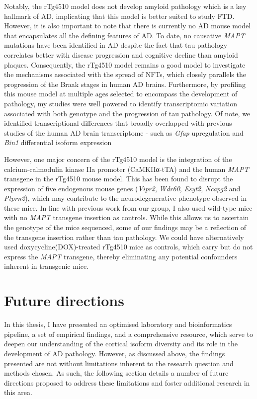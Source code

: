 Notably, the rTg4510 model does not develop amyloid pathology which is a key hallmark of AD, implicating that this model is better suited to study FTD. However, it is also important to note that there is currently no AD mouse model that encapsulates all the defining features of AD. To date, no causative \textit{MAPT} mutations have been identified in AD despite the fact that tau pathology correlates better with disease progression and cognitive decline than amyloid plaques\cite{Serrano-Pozo2016,Giannakopoulos2003,PV1992}. Consequently, the rTg4510 model remains a good model to investigate the mechanisms associated with the spread of NFTs, which closely parallels the progression of the Braak stages in human AD brains. Furthermore, by profiling this mouse model at multiple ages selected to encompass the development of pathology, my studies were well powered to identify transcriptomic variation associated with both genotype and the progression of tau pathology. Of note, we identified transcriptional differences that broadly overlapped with previous studies of the human AD brain transcriptome - such as \textit{Gfap} upregulation and \textit{Bin1} differential isoform expression

However, one major concern of the rTg4510 model is the integration of the calcium-calmodulin kinase IIa promoter (CaMKIIα-tTA) and the human \textit{MAPT} transgene in the rTg4510 mouse model. This has been found to disrupt the expression of five endogenous mouse genes (\textit{Vipr2}, \textit{Wdr60}, \textit{Esyt2}, \textit{Ncapg2} and \textit{Ptprn2}), which may contribute to the neurodegenerative phenotype observed in these mice\cite{Castanho2020,Gamache2019}. In line with previous work from our group\cite{Castanho2020}, I also used wild-type mice with no \textit{MAPT} transgene insertion as controls. While this allows us to ascertain the genotype of the mice sequenced, some of our findings may be a reflection of the transgene insertion rather than tau pathology. We could have alternatively used doxycycline(DOX)-treated rTg4510 mice as controls, which carry but do not express the \textit{MAPT} transgene, thereby eliminating any potential confounders inherent in transgenic mice. 
 
	
\section{Future directions}
In this thesis, I have presented an optimised laboratory and bioinformatics pipeline, a set of empirical findings, and a comprehensive resource, which serve to deepen our understanding of the cortical isoform diversity and its role in the development of AD pathology. However, as discussed above, the findings presented are not without limitations inherent to the research question and methods chosen. As such, the following section details a number of future directions proposed to address these limitations and foster additional research in this area.   

